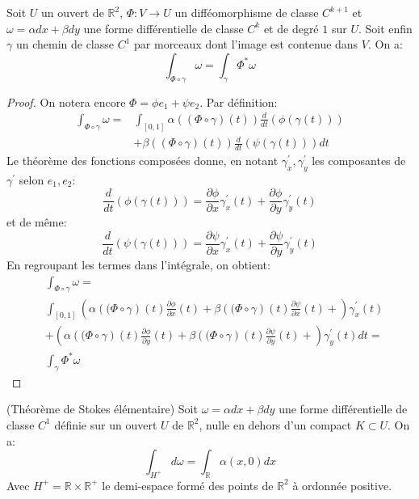 \begin{fprop}
Soit $U$ un ouvert de $\mathbb{R}^2$, $\Phi \colon V \to U$ un difféomorphisme
de classe $C^{k+1}$ et $\omega=\alpha dx + \beta dy$ une forme différentielle de
classe $C^k$ et de degré $1$ sur $U$. Soit enfin $\gamma$ un chemin de classe $C^1$ par morceaux
dont l'image est contenue dans $V$. On a:
\[
\int_{\Phi \circ \gamma} \omega = \int_{\gamma} \Phi^*\omega
\]
\end{fprop}

\begin{proof}
On notera encore $\Phi = \phi e_1 + \psi e_2$. 
Par définition:
\begin{align*}
\int_{\Phi \circ \gamma} \omega = & \int_{[0,1]}
\alpha\left((\Phi\circ\gamma)(t)\right) \frac{d}{dt}(\phi(\gamma(t))) \\
& + \beta\left((\Phi\circ\gamma)(t)\right) \frac{d}{dt}(\psi(\gamma(t))) dt
\end{align*}
Le théorème des fonctions composées donne, en notant $\gamma^\prime_x,
\gamma^\prime_y$ les composantes de $\gamma^\prime$ selon $e_1,e_2$:
\[
\frac{d}{dt}(\phi(\gamma(t))) = \frac{\partial \phi}{\partial
x}\gamma^\prime_x(t) + \frac{\partial \phi}{\partial
y}\gamma^\prime_y(t)
\]
et de même:
\[
\frac{d}{dt}(\psi(\gamma(t))) = \frac{\partial \psi}{\partial
x}\gamma^\prime_x(t) + \frac{\partial \psi}{\partial
y}\gamma^\prime_y(t)
\]
En regroupant les termes dans l'intégrale, on obtient:
\begin{align*}
& \int_{\Phi \circ \gamma} \omega = \\ &\int_{[0,1]}
\left(\alpha\left((\Phi\circ\gamma\right)(t)\frac{\partial \phi}{\partial
x}(t) +\beta\left((\Phi\circ\gamma\right)(t)\frac{\partial \psi}{\partial
x}(t)  + \right)\gamma^\prime_x(t) \\
& + \left(\alpha\left((\Phi\circ\gamma\right)(t)\frac{\partial \phi}{\partial
y}(t) +\beta\left((\Phi\circ\gamma\right)(t)\frac{\partial \psi}{\partial
y}(t)  + \right)\gamma^\prime_y(t) dt = \\
& \int_{\gamma} \Phi^*\omega
\end{align*}
\end{proof}

\begin{fprop}{(Théorème de Stokes élémentaire)}
Soit $\omega=\alpha dx + \beta dy$ une forme différentielle de classe $C^1$
définie sur un ouvert $U$ de $\mathbb{R}^2$, nulle en dehors d'un compact $K
\subset U$. On a:
\[
\int_{H^+} d \omega = \int_{\mathbb{R}} \alpha(x,0)dx
\]
Avec $H^+ = \mathbb{R} \times \mathbb{R}^+$ le demi-espace formé des points de
$\mathbb{R}^2$ à ordonnée positive.
\end{fprop}

